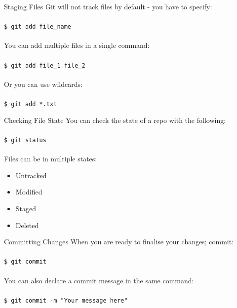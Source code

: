 \documentclass{beamer}
\begin{document}
\begin{frame}{Staging Files}
    Git will not track files by default - you have to specify: \\~\\

    {\tt \$ git add file\_name} \\~\\

    You can add multiple files in a single command: \\~\\

    {\tt \$ git add file\_1 file\_2} \\~\\

    Or you can use wildcards: \\~\\

    {\tt \$ git add *.txt}
\end{frame}

\begin{frame}{Checking File State}
    You can check the state of a repo with the following: \\~\\

    {\tt \$ git status} \\~\\
    
    Files can be in multiple states:
    \begin{itemize}
    \item Untracked
    \item Modified
    \item Staged
    \item Deleted
    \end{itemize}
\end{frame}

\begin{frame}{Committing Changes}
    When you are ready to finalise your changes; commit: \\~\\

    {\tt \$ git commit} \\~\\

    You can also declare a commit message in the same command: \\~\\

    {\tt \$ git commit -m "Your message here"}
\end{frame}
\end{document}
